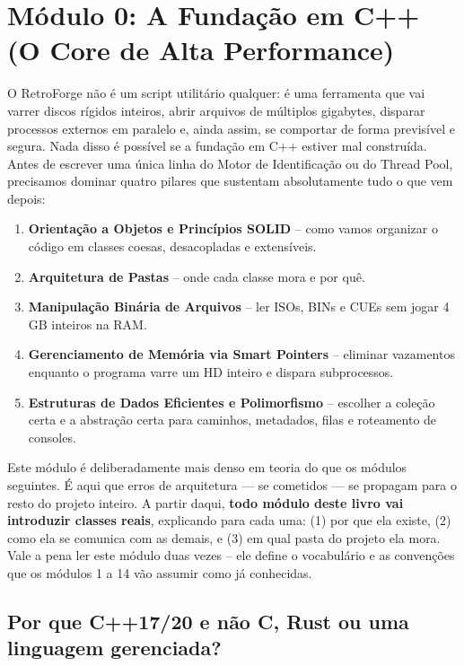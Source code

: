 \section{Módulo 0: A Fundação em C++ (O Core de Alta Performance)}

O RetroForge não é um script utilitário qualquer: é uma ferramenta que vai varrer discos rígidos inteiros, abrir arquivos de múltiplos gigabytes, disparar processos externos em paralelo e, ainda assim, se comportar de forma previsível e segura. Nada disso é possível se a fundação em C++ estiver mal construída. Antes de escrever uma única linha do Motor de Identificação ou do Thread Pool, precisamos dominar quatro pilares que sustentam absolutamente tudo o que vem depois:

\begin{enumerate}[label=\textbf{\arabic*.}]
    \item \textbf{Orientação a Objetos e Princípios SOLID} -- como vamos organizar o código em classes coesas, desacopladas e extensíveis.
    \item \textbf{Arquitetura de Pastas} -- onde cada classe mora e por quê.
    \item \textbf{Manipulação Binária de Arquivos} -- ler ISOs, BINs e CUEs sem jogar 4 GB inteiros na RAM.
    \item \textbf{Gerenciamento de Memória via Smart Pointers} -- eliminar vazamentos enquanto o programa varre um HD inteiro e dispara subprocessos.
    \item \textbf{Estruturas de Dados Eficientes e Polimorfismo} -- escolher a coleção certa e a abstração certa para caminhos, metadados, filas e roteamento de consoles.
\end{enumerate}

\begin{CaixaInfo}
Este módulo é deliberadamente mais denso em teoria do que os módulos seguintes. É aqui que erros de arquitetura --- se cometidos --- se propagam para o resto do projeto inteiro. A partir daqui, \textbf{todo módulo deste livro vai introduzir classes reais}, explicando para cada uma: (1) por que ela existe, (2) como ela se comunica com as demais, e (3) em qual pasta do projeto ela mora. Vale a pena ler este módulo duas vezes -- ele define o vocabulário e as convenções que os módulos 1 a 14 vão assumir como já conhecidas.
\end{CaixaInfo}

\subsection{Por que C++17/20 e não C, Rust ou uma linguagem gerenciada?}

